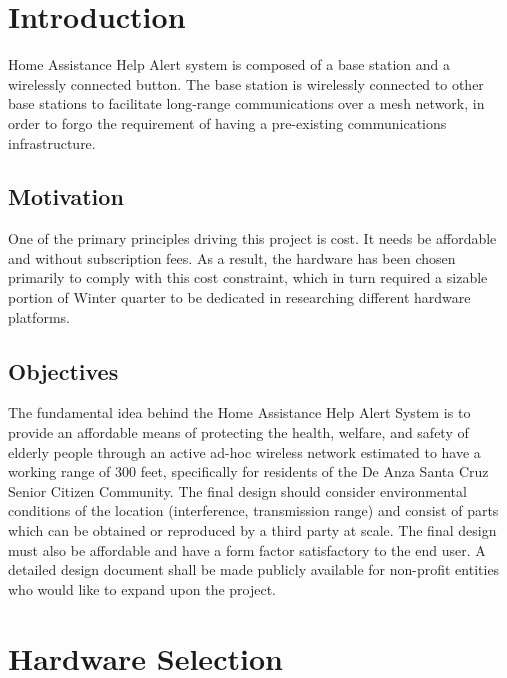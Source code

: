 \documentclass[journal,compsoc]{IEEEtran}
\begin{document}
%
\IEEEpeerreviewmaketitle

\section{Introduction}
 Home Assistance Help Alert system is composed of a base station and a wirelessly connected button.  The base station is wirelessly connected to other base stations to facilitate long-range communications over a mesh network, in order to forgo the requirement of having a pre-existing communications infrastructure.

\subsection{Motivation}
One of the primary principles driving this project is cost.  It needs be affordable and without subscription fees.  As a result, the hardware has been chosen primarily to comply with this cost constraint, which in turn required a sizable portion of Winter quarter to be dedicated in researching different hardware platforms.

\subsection{Objectives}
The fundamental idea behind the Home Assistance Help Alert System is to provide an affordable means of protecting the health, welfare, and safety of elderly people through an active ad-hoc wireless network estimated to have a working range of 300 feet, specifically for residents of the De Anza Santa Cruz Senior Citizen Community.  The final design should consider environmental conditions of the location (interference, transmission range) and consist of parts which can be obtained or reproduced by a third party at scale.  The final design must also be affordable and have a form factor satisfactory to the end user.  A detailed design document shall be made publicly available for non-profit entities who would like to expand upon the project.

\section{Hardware Selection}
\end{document}
